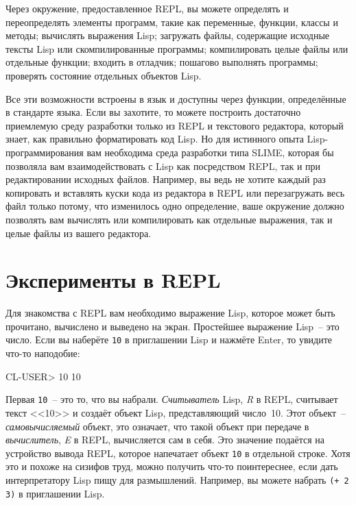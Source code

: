 Через окружение, предоставленное REPL, вы можете определять и переопределять элементы
программ, такие как переменные, функции, классы и методы; вычислять выражения Lisp;
загружать файлы, содержащие исходные тексты Lisp или скомпилированные программы;
компилировать целые файлы или отдельные функции; входить в отладчик; пошагово выполнять
программы; проверять состояние отдельных объектов Lisp.

Все эти возможности встроены в язык и доступны через функции, определённые в стандарте
языка. Если вы захотите, то можете построить достаточно приемлемую среду разработки только
из REPL и текстового редактора, который знает, как правильно форматировать код Lisp. Но для
истинного опыта Lisp-программирования вам необходима среда разработки типа SLIME, которая
бы позволяла вам взаимодействовать с Lisp как посредством REPL, так и при редактировании
исходных файлов. Например, вы ведь не хотите каждый раз копировать и вставлять куски
кода из редактора в REPL или перезагружать весь файл только потому, что изменилось одно
определение, ваше окружение должно позволять вам вычислять или компилировать как отдельные
выражения, так и целые файлы из вашего редактора.

\section{Эксперименты в REPL}

Для знакомства с REPL вам необходимо выражение Lisp, которое может быть прочитано,
вычислено и выведено на экран. Простейшее выражение Lisp~-- это число. Если вы наберёте
\lstinline{10} в приглашении Lisp и нажмёте Enter, то увидите что-то наподобие:

\begin{myverb}
CL-USER> 10
10
\end{myverb}

Первая \lstinline{10}~-- это то, что вы набрали. \emph{Считыватель} Lisp, \emph{R} в REPL,
считывает текст <<10>> и создаёт объект Lisp, представляющий число~10. Этот объект~--
\emph{самовычисляемый} объект, это означает, что такой объект при передаче в \emph{вычислитель},
\emph{E} в REPL, вычисляется сам в себя. Это значение подаётся на устройство вывода REPL,
которое напечатает объект \lstinline{10} в отдельной строке. Хотя это и похоже на сизифов труд, можно
получить что-то поинтереснее, если дать интерпретатору Lisp пищу для размышлений.
Например, вы можете набрать \lstinline{(+ 2 3)} в приглашении Lisp.

